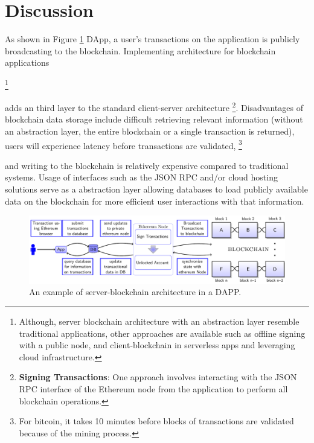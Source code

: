 	
\section{Discussion}
As shown in 
		Figure \ref{fig:DApp} \gls{DApp}, a user's transactions on the application is publicly broadcasting to the blockchain. 
		Implementing architecture for blockchain 
		applications 
		
		\footnote{Although, server blockchain architecture with an abstraction layer resemble traditional applications, other approaches are available such as offline signing with a public node, and client-blockchain in serverless apps and leveraging cloud infrastructure.} 
		
		adds an third layer to the standard client-server architecture 	\footnote{ \textbf{Signing Transactions}: One approach involves interacting with the JSON RPC interface of the \gls{Ethereum} node from the application to perform all blockchain operations.}.
		 Disadvantages of blockchain data storage include difficult retrieving relevant information (without an abstraction layer, the entire blockchain or a single transaction is returned), users will experience latency before transactions are validated, 	\footnote{For bitcoin, it takes 10 minutes before blocks of transactions are validated because of the mining process.}
		 
		  and writing to the blockchain is relatively expensive compared to traditional systems. Usage of interfaces such as the JSON RPC and/or cloud hosting 
	 solutions	
	 	 serve as a abstraction layer allowing databases to load publicly available data on the blockchain
	 	 for more efficient user interactions with that information. 

\begin{warpprint}
\begin{figure}[ht]
\begin{adjustbox}{center,max width=1.1\textwidth}
\includegraphics[width=1.2\linewidth]{Diagrams/blockchainInSimpleApp.pdf}
\end{adjustbox}
\caption{An example of server-blockchain architecture in a DAPP.}
\label{fig:DApp}
\end{figure}
\end{warpprint}

